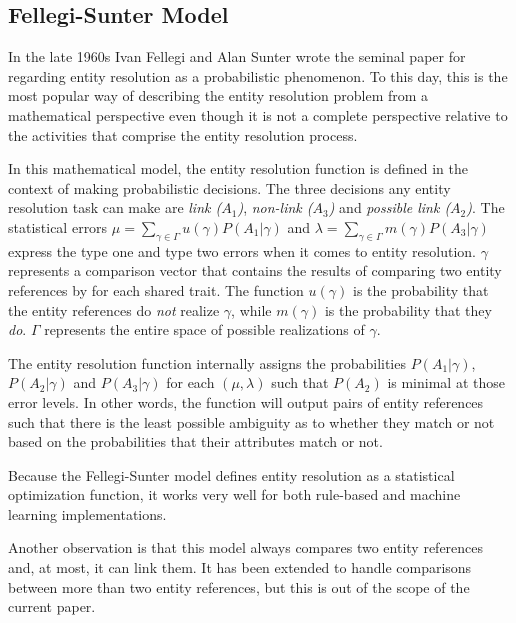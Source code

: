 \documentclass[11pt]{article}
\begin{document}
    \subsection[fsm]{Fellegi-Sunter Model}\label{subsec:fsm}

    In the late 1960s Ivan Fellegi and Alan Sunter wrote the seminal
    paper\cite{fs1969} for regarding entity resolution as a probabilistic
    phenomenon.
    To this day, this is the most popular way of describing the entity
    resolution problem from a mathematical perspective even though it is not
    a complete perspective relative to the activities that comprise the entity
    resolution process.

    In this mathematical model, the entity resolution function is defined in the
    context of making probabilistic decisions.
    The three decisions any entity resolution task can make are
    \textit{link ($A_1$)}, \textit{non-link ($A_3$)} and
    \textit{possible link ($A_2$)}.
    The statistical errors
    $\mu=\sum_{\gamma \in \varGamma}u(\gamma)P(A_1|\gamma)$ and
    $\lambda=\sum_{\gamma \in \varGamma}m(\gamma)P(A_3|\gamma)$ express the type
    one and type two errors when it comes to entity resolution.
    $\gamma$ represents a comparison vector that contains the results of
    comparing two entity references by for each shared trait. The function
    $u(\gamma)$ is the probability that the entity references do \textit{not}
    realize $\gamma$, while $m(\gamma)$ is the probability that they \textit{do}.
    $\varGamma$ represents the entire space of possible realizations of $\gamma$.

    The entity resolution function internally assigns the probabilities
    $P(A_1|\gamma)$, $P(A_2|\gamma)$ and $P(A_3|\gamma)$ for each $(\mu,
    \lambda)$ such that $P(A_2)$ is minimal at those error levels.
    In other words, the function will output pairs of entity references such
    that there is the least possible ambiguity as to whether they match or not
    based on the probabilities that their attributes match or not.

    Because the Fellegi-Sunter model defines entity resolution as a statistical
    optimization function, it works very well for both
    rule-based\cite{oyster2012} and machine learning\cite{deepm2020}
    implementations.
    
    Another observation is that this model always compares two entity references
    and, at most, it can link them\cite{Tal11,Kon19}.
    It has been extended to handle comparisons between more than two entity
    references\cite{Kon19}, but this is out of the scope of the current paper.
    
\end{document}
